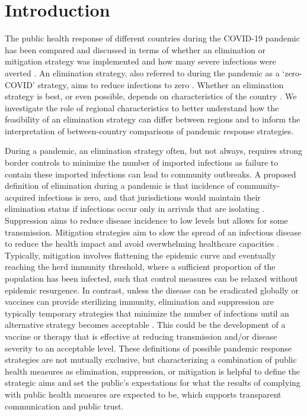 \documentclass[pdflatex]{sn-jnl}
\theoremstyle{thmstyleone}%
\theoremstyle{thmstyletwo}%
\theoremstyle{thmstylethree}%
\begin{document}
\section{Introduction}\label{sec:intro}

The public health response of different countries during the COVID-19 pandemic has been compared and discussed in terms of whether an elimination or mitigation strategy was implemented and how many severe infections were averted \citep{peng2023relative}. An elimination strategy, also referred to during the pandemic as a `zero-COVID' strategy, aims to reduce infections to zero \citep{baker_elimination_2020, metcalf_challenges_2021, heywood_eradication_2020, wu_aggressive_2021}. Whether an elimination strategy is best, or even possible, depends on characteristics of the country \citep{martignoni_is_2024,french2025preparing}. We investigate the role of regional characteristics to better understand how the feasibility of an elimination strategy can differ between regions and to inform the interpretation of between-country comparisons of pandemic response strategies. 

During a pandemic, an elimination strategy often, but not always, requires strong border controls to minimize the number of imported infections as failure to contain these imported infections can lead to community outbreaks. A proposed definition of elimination during a pandemic is that incidence of community-acquired infections is zero, and that jurisdictions would maintain their elimination status if infections occur only in arrivals that are isolating \citep{baker_elimination_2020}.  Suppression aims to reduce disease incidence to low levels but allows for some transmission. Mitigation strategies aim to slow the spread of an infectious disease to reduce the health impact and avoid overwhelming healthcare capacities \citep{baker2023covid, wu_aggressive_2021,thompson2026infectious}. Typically, mitigation involves flattening the epidemic curve and eventually reaching the herd immunity threshold, where a sufficient proportion of the population has been infected, such that control measures can be relaxed without epidemic resurgence. In contrast, unless the disease can be eradicated globally or vaccines can provide sterilizing immunity, elimination and suppression are typically temporary strategies that minimize the number of infections until an alternative strategy becomes acceptable \citep{french2025preparing}. This could be the development of a vaccine or therapy that is effective at reducing transmission and/or disease severity to an acceptable level. These definitions of possible pandemic response strategies are not mutually exclusive, but characterizing a combination of public health measures as elimination, suppression, or mitigation is helpful to define the strategic aims and set the public's expectations for what the results of complying with public health measures are expected to be, which supports transparent communication and public trust.
\end{document}
